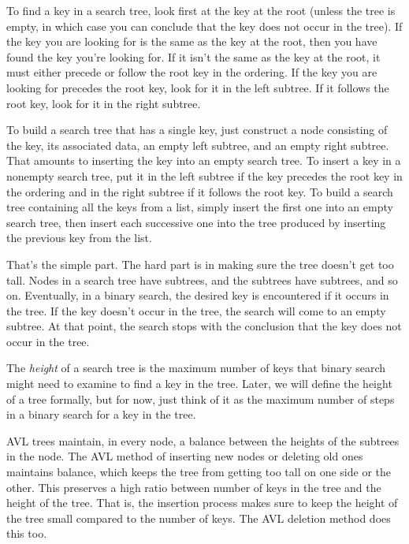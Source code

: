 \label{binary-search-def}
To find a key in a search tree,
look first at the key at the root (unless the tree is empty,
in which case
you can conclude that the key does not occur in the tree).
If the key you are looking for is the same as the key at the root,
then you have found the key you're looking for.
If it isn't the same as the key at the root,
it must either precede or follow the root key in the ordering.
If the key you are looking for precedes the root key,
look for it in the left subtree.
If it follows the root key, look for it in the right subtree.

To build a search tree that has a single key,
just construct a node consisting of the key,
its associated data,
an empty left subtree,
and an empty right subtree.
That amounts to inserting the key into an empty search tree.
To insert a key in a nonempty search tree, put it in the left subtree
if the key precedes the root key in the ordering and
in the right subtree if it follows the root key.
\label{insertion-def}
To build a search tree containing
all the keys from a list, simply insert the first one into an empty
search tree, then insert each successive one into the tree
produced by inserting the previous key from the list.

That's the simple part.
The hard part is in making sure the tree
doesn't get too tall.
Nodes in a search tree have subtrees,
and the subtrees have subtrees, and so on.
Eventually, in a binary search,
the desired key is encountered if it occurs in the tree.
If the key doesn't occur in the tree, the search will come to
an empty subtree.
At that point, the search stops with the conclusion that the key
does not occur in the tree.

The
\label{height-is-max-steps}\emph{height}
of a search tree is the maximum number of keys
that binary search might need
to examine to find a key in the tree.
Later, we will define the height of a tree formally,
but for now, just think of it as the maximum number of steps
in a binary search for a key in the tree.

AVL trees maintain, in every node,
a balance between the heights of the subtrees in the node.
The AVL method of inserting new nodes or deleting old ones
maintains balance,
which keeps the tree from getting too tall
on one side or the other.
This preserves a high ratio between number of keys
in the tree and the height of the tree.
That is, the insertion process makes sure
to keep the height of the tree small
compared to the number of keys.
The AVL deletion method does this too.

